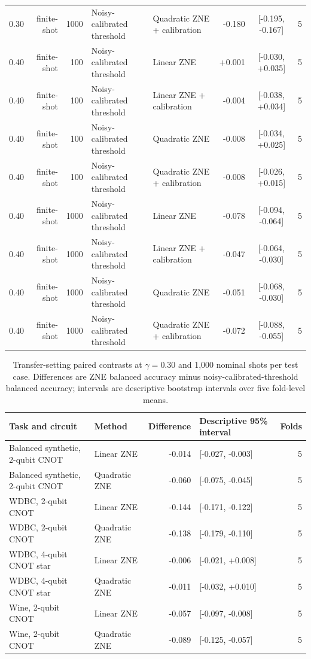 \documentclass[10pt]{article}
\begin{document}
\begin{table}[t]
\begin{tabular}{@{}l r r l l r c r@{}}
0.30 & finite-shot & 1000 & Noisy-calibrated threshold & Quadratic ZNE + calibration & -0.180 & [-0.195, -0.167] & 5 \\
0.40 & finite-shot & 100 & Noisy-calibrated threshold & Linear ZNE & +0.001 & [-0.030, +0.035] & 5 \\
0.40 & finite-shot & 100 & Noisy-calibrated threshold & Linear ZNE + calibration & -0.004 & [-0.038, +0.034] & 5 \\
0.40 & finite-shot & 100 & Noisy-calibrated threshold & Quadratic ZNE & -0.008 & [-0.034, +0.025] & 5 \\
0.40 & finite-shot & 100 & Noisy-calibrated threshold & Quadratic ZNE + calibration & -0.008 & [-0.026, +0.015] & 5 \\
0.40 & finite-shot & 1000 & Noisy-calibrated threshold & Linear ZNE & -0.078 & [-0.094, -0.064] & 5 \\
0.40 & finite-shot & 1000 & Noisy-calibrated threshold & Linear ZNE + calibration & -0.047 & [-0.064, -0.030] & 5 \\
0.40 & finite-shot & 1000 & Noisy-calibrated threshold & Quadratic ZNE & -0.051 & [-0.068, -0.030] & 5 \\
0.40 & finite-shot & 1000 & Noisy-calibrated threshold & Quadratic ZNE + calibration & -0.072 & [-0.088, -0.055] & 5 \\
\bottomrule
\end{tabular}
\end{table}

\begin{table}[t]\centering\scriptsize
\caption{Transfer-setting paired contrasts at $\gamma=0.30$ and 1,000 nominal shots per test case. Differences are ZNE balanced accuracy minus noisy-calibrated-threshold balanced accuracy; intervals are descriptive bootstrap intervals over five fold-level means.}
\label{tab:transferpaired}
\begin{tabular}{@{}l l r l r@{}}\toprule
Task and circuit & Method & Difference & Descriptive 95\% interval & Folds \\
\midrule
Balanced synthetic, 2-qubit CNOT & Linear ZNE & -0.014 & [-0.027, -0.003] & 5 \\
Balanced synthetic, 2-qubit CNOT & Quadratic ZNE & -0.060 & [-0.075, -0.045] & 5 \\
WDBC, 2-qubit CNOT & Linear ZNE & -0.144 & [-0.171, -0.122] & 5 \\
WDBC, 2-qubit CNOT & Quadratic ZNE & -0.138 & [-0.179, -0.110] & 5 \\
WDBC, 4-qubit CNOT star & Linear ZNE & -0.006 & [-0.021, +0.008] & 5 \\
WDBC, 4-qubit CNOT star & Quadratic ZNE & -0.011 & [-0.032, +0.010] & 5 \\
Wine, 2-qubit CNOT & Linear ZNE & -0.057 & [-0.097, -0.008] & 5 \\
Wine, 2-qubit CNOT & Quadratic ZNE & -0.089 & [-0.125, -0.057] & 5 \\
\bottomrule\end{tabular}\end{table}
\end{document}
